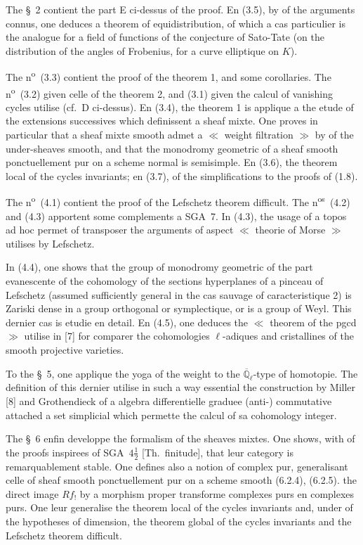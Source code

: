 \documentclass[12pt,a4paper]{article}
\theoremstyle{plain}
\theoremstyle{definition}
\theoremstyle{definition}
\theoremstyle{remark}
\begin{document}
The \S~2 contient the part E ci-dessus of the proof. En (3.5), by of the arguments connus, one deduces a theorem of equidistribution, of which a cas particulier is the analogue for a field of functions of the conjecture of Sato-Tate (on the distribution of the angles of Frobenius, for a curve elliptique on $K$).

The n\textsuperscript{o}~(3.3) contient the proof of the theorem 1, and some corollaries. The n\textsuperscript{o}~(3.2) given celle of the theorem 2, and (3.1) given the calcul of vanishing cycles utilise (cf.~D ci-dessus). En (3.4), the theorem 1 is applique a the etude of the extensions successives which definissent a sheaf mixte. One proves in particular that a sheaf mixte smooth admet a $\ll$ weight filtration $\gg$ by of the under-sheaves smooth, and that the monodromy geometric of a sheaf smooth ponctuellement pur on a scheme normal is semisimple. En (3.6), the theorem local of the cycles invariants; en (3.7), of the simplifications to the proofs of (1.8).

The n\textsuperscript{o}~(4.1) contient the proof of the Lefschetz theorem difficult. The n\textsuperscript{os}~(4.2) and (4.3) apportent some complements a SGA~7. In (4.3), the usage of a topos ad hoc permet of transposer the arguments of aspect $\ll$ theorie of Morse $\gg$ utilises by Lefschetz.

In (4.4), one shows that the group of monodromy geometric of the part evanescente of the cohomology of the sections hyperplanes of a pinceau of Lefschetz (assumed sufficiently general in the cas sauvage of caracteristique 2) is Zariski dense in a group orthogonal or symplectique, or is a group of Weyl. This dernier cas is etudie en detail. En (4.5), one deduces the $\ll$ theorem of the pgcd $\gg$ utilise in [7] for comparer the cohomologies $\ell$-adiques and cristallines of the smooth projective varieties.

To the \S~5, one applique the yoga of the weight to the $\overline{\mathbb{Q}}_\ell$-type of homotopie. The definition of this dernier utilise in such a way essential the construction by Miller [8] and Grothendieck of a algebra differentielle graduee (anti-) commutative attached a set simplicial which permette the calcul of sa cohomology integer.

The \S~6 enfin developpe the formalism of the sheaves mixtes. One shows, with of the proofs inspirees of SGA~$4\frac{1}{2}$ [Th.~finitude], that leur category is remarquablement stable. One defines also a notion of complex pur, generalisant celle of sheaf smooth ponctuellement pur on a scheme smooth (6.2.4), (6.2.5). the direct image $Rf_!$ by a morphism proper transforme complexes purs en complexes purs. One leur generalise the theorem local of the cycles invariants and, under of the hypotheses of dimension, the theorem global of the cycles invariants and the Lefschetz theorem difficult.
\end{document}
